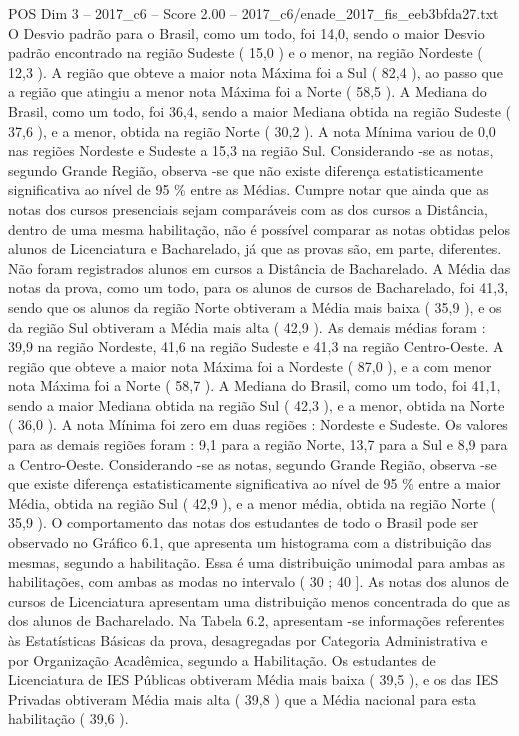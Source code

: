 \begin{textsample}{POS Dim 3 – 2017\_c6 – Score 2.00 – 2017\_c6/enade\_2017\_fis\_eeb3bfda27.txt}
O Desvio padrão para o Brasil, como um todo, foi 14,0, sendo o maior Desvio padrão encontrado na região Sudeste ( 15,0 ) e o menor, na região Nordeste ( 12,3 ).
A região que obteve a maior nota Máxima foi a Sul ( 82,4 ), ao passo que a região que atingiu a menor nota Máxima foi a Norte ( 58,5 ).
A Mediana do Brasil, como um todo, foi 36,4, sendo a maior Mediana obtida na região Sudeste ( 37,6 ), e a menor, obtida na região Norte ( 30,2 ).
A nota Mínima variou de 0,0 nas regiões Nordeste e Sudeste a 15,3 na região Sul.
Considerando -se as notas, segundo Grande Região, observa -se que não existe diferença estatisticamente significativa ao nível de 95 \% entre as Médias.
Cumpre notar que ainda que as notas dos cursos presenciais sejam comparáveis com as dos cursos a Distância, dentro de uma mesma habilitação, não é possível comparar as notas obtidas pelos alunos de Licenciatura e Bacharelado, já que as provas são, em parte, diferentes.
Não foram registrados alunos em cursos a Distância de Bacharelado.
A Média das notas da prova, como um todo, para os alunos de cursos de Bacharelado, foi 41,3, sendo que os alunos da região Norte obtiveram a Média mais baixa ( 35,9 ), e os da região Sul obtiveram a Média mais alta ( 42,9 ).
As demais médias foram : 39,9 na região Nordeste, 41,6 na região Sudeste e 41,3 na região Centro-Oeste.
A região que obteve a maior nota Máxima foi a Nordeste ( 87,0 ), e a com menor nota Máxima foi a Norte ( 58,7 ).
A Mediana do Brasil, como um todo, foi 41,1, sendo a maior Mediana obtida na região Sul ( 42,3 ), e a menor, obtida na Norte ( 36,0 ).
A nota Mínima foi zero em duas regiões : Nordeste e Sudeste.
Os valores para as demais regiões foram : 9,1 para a região Norte, 13,7 para a Sul e 8,9 para a Centro-Oeste.
Considerando -se as notas, segundo Grande Região, observa -se que existe diferença estatisticamente significativa ao nível de 95 \% entre a maior Média, obtida na região Sul ( 42,9 ), e a menor média, obtida na região Norte ( 35,9 ).
O comportamento das notas dos estudantes de todo o Brasil pode ser observado no Gráfico 6.1, que apresenta um histograma com a distribuição das mesmas, segundo a habilitação.
Essa é uma distribuição unimodal para ambas as habilitações, com ambas as modas no intervalo ( 30 ; 40 ].
As notas dos alunos de cursos de Licenciatura apresentam uma distribuição menos concentrada do que as dos alunos de Bacharelado.
Na Tabela 6.2, apresentam -se informações referentes às Estatísticas Básicas da prova, desagregadas por Categoria Administrativa e por Organização Acadêmica, segundo a Habilitação.
Os estudantes de Licenciatura de IES Públicas obtiveram Média mais baixa ( 39,5 ), e os das IES Privadas obtiveram Média mais alta ( 39,8 ) que a Média nacional para esta habilitação ( 39,6 ).

\end{textsample}
